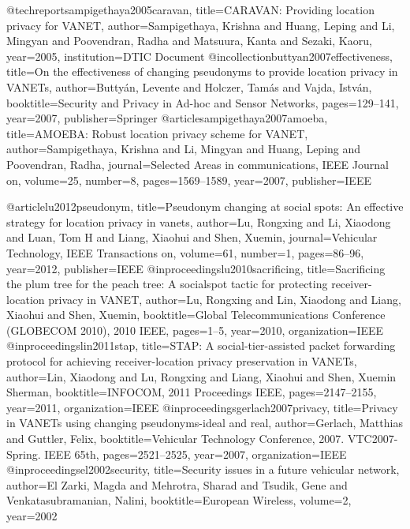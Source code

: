 {{{{{{{	
	
	@techreport{sampigethaya2005caravan,
	title={CARAVAN: Providing location privacy for VANET},
	author={Sampigethaya, Krishna and Huang, Leping and Li, Mingyan and Poovendran, Radha and Matsuura, Kanta and Sezaki, Kaoru},
	year={2005},
	institution={DTIC Document}
	}
	@incollection{buttyan2007effectiveness,
	title={On the effectiveness of changing pseudonyms to provide location privacy in VANETs},
	author={Butty{\'a}n, Levente and Holczer, Tam{\'a}s and Vajda, Istv{\'a}n},
	booktitle={Security and Privacy in Ad-hoc and Sensor Networks},
	pages={129--141},
	year={2007},
	publisher={Springer}
	}
	@article{sampigethaya2007amoeba,
	title={AMOEBA: Robust location privacy scheme for VANET},
	author={Sampigethaya, Krishna and Li, Mingyan and Huang, Leping and Poovendran, Radha},
	journal={Selected Areas in communications, IEEE Journal on},
	volume={25},
	number={8},
	pages={1569--1589},
	year={2007},
	publisher={IEEE}
	}
	
	@article{lu2012pseudonym,
	title={Pseudonym changing at social spots: An effective strategy for location privacy in vanets},
	author={Lu, Rongxing and Li, Xiaodong and Luan, Tom H and Liang, Xiaohui and Shen, Xuemin},
	journal={Vehicular Technology, IEEE Transactions on},
	volume={61},
	number={1},
	pages={86--96},
	year={2012},
	publisher={IEEE}
	}
	@inproceedings{lu2010sacrificing,
	title={Sacrificing the plum tree for the peach tree: A socialspot tactic for protecting receiver-location privacy in VANET},
	author={Lu, Rongxing and Lin, Xiaodong and Liang, Xiaohui and Shen, Xuemin},
	booktitle={Global Telecommunications Conference (GLOBECOM 2010), 2010 IEEE},
	pages={1--5},
	year={2010},
	organization={IEEE}
	}
	@inproceedings{lin2011stap,
	title={STAP: A social-tier-assisted packet forwarding protocol for achieving receiver-location privacy preservation in VANETs},
	author={Lin, Xiaodong and Lu, Rongxing and Liang, Xiaohui and Shen, Xuemin Sherman},
	booktitle={INFOCOM, 2011 Proceedings IEEE},
	pages={2147--2155},
	year={2011},
	organization={IEEE}
	}
	@inproceedings{gerlach2007privacy,
	title={Privacy in VANETs using changing pseudonyms-ideal and real},
	author={Gerlach, Matthias and Guttler, Felix},
	booktitle={Vehicular Technology Conference, 2007. VTC2007-Spring. IEEE 65th},
	pages={2521--2525},
	year={2007},
	organization={IEEE}
	}
	@inproceedings{el2002security,
	title={Security issues in a future vehicular network},
	author={El Zarki, Magda and Mehrotra, Sharad and Tsudik, Gene and Venkatasubramanian, Nalini},
	booktitle={European Wireless},
	volume={2},
	year={2002}
	}
	
}}}}}}}
